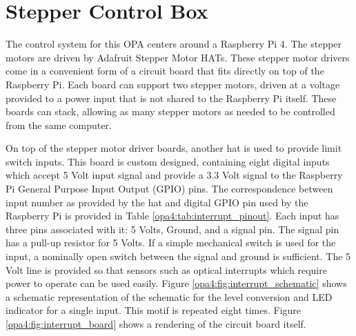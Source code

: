 \clearpage
\section{Stepper Control Box}  %

The control system for this OPA centers around a Raspberry Pi 4\cite{rpi4}.
The stepper motors are driven by Adafruit Stepper Motor HATs\cite{adafruit_stepper_hat}.
These stepper motor drivers come in a convenient form of a circuit board that fits directly on top of the Raspberry Pi.
Each board can support two stepper motors, driven at a voltage provided to a power input that is not shared to the Raspberry Pi itself.
These boards can stack, allowing as many stepper motors as needed to be controlled from the same computer.

On top of the stepper motor driver boards, another hat is used to provide limit switch inputs.
This board is custom designed, containing eight digital inputs which accept 5 Volt input signal and provide a 3.3 Volt signal to the Raspberry Pi General Purpose Input Output (GPIO) pins.
The correspondence between input number as provided by the hat and digital GPIO pin used by the Raspberry Pi is provided in Table \ref{opa4:tab:interrupt_pinout}.
Each input has three pins associated with it: 5 Volts, Ground, and a signal pin.
The signal pin has a pull-up resistor for 5 Volts.
If a simple mechanical switch is used for the input, a nominally open switch between the signal and ground is sufficient.
The 5 Volt line is provided so that sensors such as optical interrupts which require power to operate can be used easily.
Figure \ref{opa4:fig:interrupt_schematic} shows a schematic representation of the schematic for the level conversion and LED indicator for a single input.
This motif is repeated eight times.
Figure \ref{opa4:fig:interrupt_board} shows a rendering of the circuit board itself.

